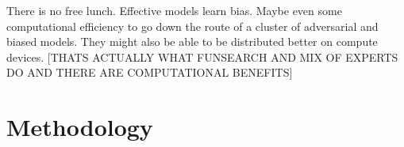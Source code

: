 \documentclass[11pt, oneside]{article}   	%
\begin{document}




There is no free lunch.  \cite{Wolpertetal1997}  Effective models learn bias.  \cite{Mitchell1980}  Maybe even some computational efficiency to go down the route of a cluster of adversarial and biased models. They might also be able to be distributed better on compute devices. [THATS ACTUALLY WHAT FUNSEARCH AND MIX OF EXPERTS DO AND THERE ARE COMPUTATIONAL BENEFITS]





\section{Methodology}
\end{document}
